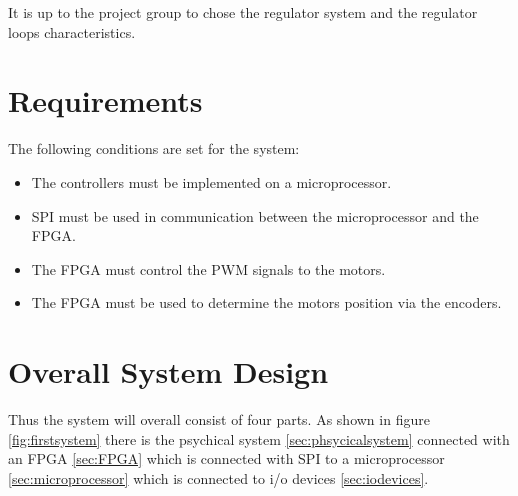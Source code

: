 It is up to the project group to chose the regulator system and the regulator loops characteristics.

\section{Requirements}

The following conditions are set for the system:
\begin{itemize}
\item The controllers must be implemented on a microprocessor.
\item SPI must be used in communication between the microprocessor and the FPGA.
\item The FPGA must control the PWM signals to the motors.
\item The FPGA must be used to determine the motors position via the encoders.
\end{itemize}

\section{Overall System Design}

Thus the system will overall consist of four parts. As shown in figure \ref{fig:firstsystem} there is the psychical system \ref{sec:phsycicalsystem} connected with an FPGA \ref{sec:FPGA} which is connected with SPI to a microprocessor \ref{sec:microprocessor} which is connected to i/o devices \ref{sec:iodevices}.

